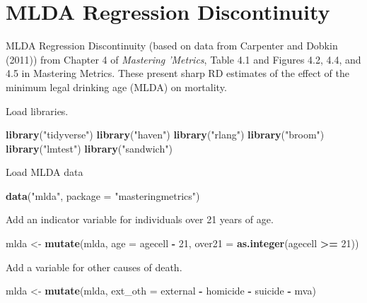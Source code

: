 \documentclass[]{book}
\newenvironment{Shaded}{\begin{snugshade}}{\end{snugshade}}
\newcommand{\KeywordTok}[1]{\textcolor[rgb]{0.13,0.29,0.53}{\textbf{#1}}}
\newcommand{\DataTypeTok}[1]{\textcolor[rgb]{0.13,0.29,0.53}{#1}}
\newcommand{\DecValTok}[1]{\textcolor[rgb]{0.00,0.00,0.81}{#1}}
\newcommand{\StringTok}[1]{\textcolor[rgb]{0.31,0.60,0.02}{#1}}
\newcommand{\OperatorTok}[1]{\textcolor[rgb]{0.81,0.36,0.00}{\textbf{#1}}}
\newcommand{\NormalTok}[1]{#1}
\theoremstyle{definition}
\theoremstyle{definition}
\theoremstyle{definition}
\theoremstyle{remark}
\begin{document}
\chapter{MLDA Regression
Discontinuity}\label{mlda-regression-discontinuity}

MLDA Regression Discontinuity (based on data from Carpenter and Dobkin
(2011)) from Chapter 4 of \emph{Mastering 'Metrics}, Table 4.1 and
Figures 4.2, 4.4, and 4.5 in Mastering Metrics. These present sharp RD
estimates of the effect of the minimum legal drinking age (MLDA) on
mortality.

Load libraries.

\begin{Shaded}
\begin{Highlighting}[]
\KeywordTok{library}\NormalTok{(}\StringTok{"tidyverse"}\NormalTok{)}
\KeywordTok{library}\NormalTok{(}\StringTok{"haven"}\NormalTok{)}
\KeywordTok{library}\NormalTok{(}\StringTok{"rlang"}\NormalTok{)}
\KeywordTok{library}\NormalTok{(}\StringTok{"broom"}\NormalTok{)}
\KeywordTok{library}\NormalTok{(}\StringTok{"lmtest"}\NormalTok{)}
\KeywordTok{library}\NormalTok{(}\StringTok{"sandwich"}\NormalTok{)}
\end{Highlighting}
\end{Shaded}

Load MLDA data

\begin{Shaded}
\begin{Highlighting}[]
\KeywordTok{data}\NormalTok{(}\StringTok{"mlda"}\NormalTok{, }\DataTypeTok{package =} \StringTok{"masteringmetrics"}\NormalTok{)}
\end{Highlighting}
\end{Shaded}

Add an indicator variable for individuals over 21 years of age.

\begin{Shaded}
\begin{Highlighting}[]
\NormalTok{mlda <-}\StringTok{ }\KeywordTok{mutate}\NormalTok{(mlda,}
               \DataTypeTok{age =}\NormalTok{ agecell }\OperatorTok{-}\StringTok{ }\DecValTok{21}\NormalTok{,}
               \DataTypeTok{over21 =} \KeywordTok{as.integer}\NormalTok{(agecell }\OperatorTok{>=}\StringTok{ }\DecValTok{21}\NormalTok{))}
\end{Highlighting}
\end{Shaded}

Add a variable for other causes of death.

\begin{Shaded}
\begin{Highlighting}[]
\NormalTok{mlda <-}\StringTok{ }\KeywordTok{mutate}\NormalTok{(mlda, }\DataTypeTok{ext_oth =}\NormalTok{ external }\OperatorTok{-}\StringTok{ }\NormalTok{homicide }\OperatorTok{-}\StringTok{ }\NormalTok{suicide }\OperatorTok{-}\StringTok{ }\NormalTok{mva)}
\end{Highlighting}
\end{Shaded}
\end{document}
